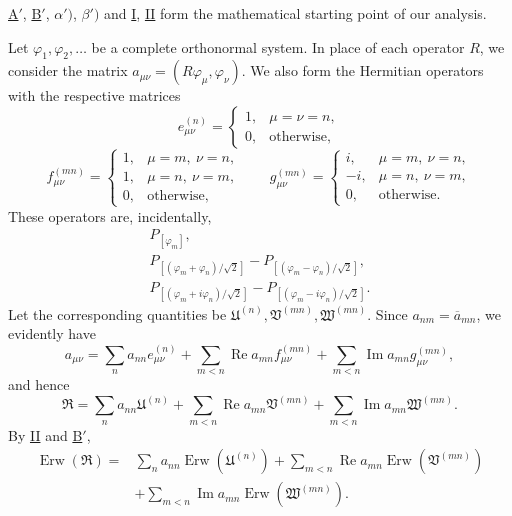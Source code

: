 \documentclass[fontsize=13pt,twoside,openany,headings=normal,parskip=false,bookmarkpackage=false,DIV=calc]{scrbook}
\begin{document}
\hyperref[cond:IV.Aprime]{A$'$}, \hyperref[cond:IV.Bprime]{B$'$}, \hyperref[def:IV.1.alphaprime]{$\alpha')$}, \hyperref[def:IV.1.betaprime]{$\beta')$} and \hyperref[cond:IV.2.I]{I}, \hyperref[cond:IV.2.II]{II} form the mathematical starting point of our analysis.

Let $\varphi_1,\varphi_2,\ldots$ be a complete orthonormal system. In place of each operator $R$, we consider the matrix $a_{\mu\nu}=(R\varphi_\mu,\varphi_\nu)$. We also form the Hermitian operators with the respective matrices
\[
e_{\mu\nu}^{(n)}=\begin{cases}1,&\mu=\nu=n,\\0,&\text{otherwise},\end{cases}
\]
\[
f_{\mu\nu}^{(mn)}=\begin{cases}1,&\mu=m,\ \nu=n,\\1,&\mu=n,\ \nu=m,\\0,&\text{otherwise},\end{cases}
\qquad
g_{\mu\nu}^{(mn)}=\begin{cases}i,&\mu=m,\ \nu=n,\\-i,&\mu=n,\ \nu=m,\\0,&\text{otherwise}.\end{cases}
\]
These operators are, incidentally,
\begin{gather*}
P_{[\varphi_m]},\\
P_{[(\varphi_m+\varphi_n)/\sqrt2]}-P_{[(\varphi_m-\varphi_n)/\sqrt2]},\\
P_{[(\varphi_m+i\varphi_n)/\sqrt2]}-P_{[(\varphi_m-i\varphi_n)/\sqrt2]}.
\end{gather*}
Let the corresponding quantities be $\mathfrak U^{(n)},\mathfrak V^{(mn)},\mathfrak W^{(mn)}$. Since $a_{nm}=\overline{a}_{mn}$, we evidently have
\[
a_{\mu\nu}=\sum_n a_{nn}e_{\mu\nu}^{(n)}
+\sum_{m<n}\operatorname{Re}a_{mn}f_{\mu\nu}^{(mn)}
+\sum_{m<n}\operatorname{Im}a_{mn}g_{\mu\nu}^{(mn)},
\]
and hence
\[
\mathfrak R=\sum_n a_{nn}\mathfrak U^{(n)}
+\sum_{m<n}\operatorname{Re}a_{mn}\mathfrak V^{(mn)}
+\sum_{m<n}\operatorname{Im}a_{mn}\mathfrak W^{(mn)}.
\]
By \hyperref[cond:IV.2.II]{II} and \hyperref[cond:IV.Bprime]{B$'$},
\begin{align*}
\operatorname{Erw}(\mathfrak R)={}&\sum_n a_{nn}\operatorname{Erw}(\mathfrak U^{(n)})
+\sum_{m<n}\operatorname{Re}a_{mn}\operatorname{Erw}(\mathfrak V^{(mn)})\\
&+\sum_{m<n}\operatorname{Im}a_{mn}\operatorname{Erw}(\mathfrak W^{(mn)}).
\end{align*}
\end{document}
